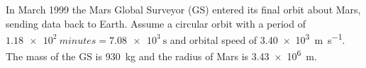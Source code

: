 \documentclass{../../../oss-classkick-exam}
\begin{document}
\begin{questions}


  \question In March 1999 the Mars Global Surveyor (GS) entered its final orbit
  about Mars, sending data back to Earth. Assume a circular orbit with a period
  of $\SI{1.18e2}{minutes}=\SI{7.08e3}{\second}$ and orbital speed of
  \SI{3.40e3}{\metre\per\second}. The mass of the GS is \SI{930}{\kilo\gram}
  and the radius of Mars is \SI{3.43e6}{\metre}.
\end{questions}
\end{document}
